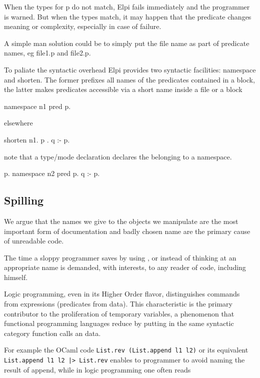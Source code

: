 \documentclass[a4paper, 11pt]{book}
\begin{document}
When the types for p do not match, Elpi fails immediately
and the programmer is warned. But when the types match, it may
happen that the predicate changes meaning or complexity,
especially in case of failure.

A simple man solution could be to simply put the file name
as part of predicate names, eg file1.p and file2.p.

To paliate the syntactic overhead Elpi provides two syntactic
facilities: namespace and shorten. The former prefixes all
names of the predicates contained in a block, the latter makes
predicates accessible via a short name inside a file or a block

\begin{elpicode}
namespace n1 {
  pred p.
}
\end{elpicode}

elsewhere

\begin{elpicode}
shorten n1.{ p }.
q :- p.
\end{elpicode}

note that a type/mode declaration declares the belonging to a namespace.

\begin{elpicode}
p.
namespace n2 {
  pred p.
  q :- p.
}
\end{elpicode}

\subsection{Spilling}

We argue that the names we give to the objects we manipulate
are the most important form of documentation and badly chosen
name are the primary cause of unreadable code.

The time a sloppy programmer saves by using , 
or  instead of thinking at an appropriate name is
demanded, with interests, to any reader of code, including himself.

Logic programming, even in its Higher Order flavor, distinguishes
commands from expressions (predicates from data). This characteristic
is the primary contributor to the proliferation of temporary
variables, a phenomenon that functional programming languages
reduce by putting in the same syntactic category function calls an
data. 

For example the OCaml code \texttt{List.rev (List.append l1 l2)}
or its equivalent \texttt{List.append l1 l2 |> List.rev} enables
to programmer to avoid naming the result of append, while in logic
programming one often reads
\end{document}
